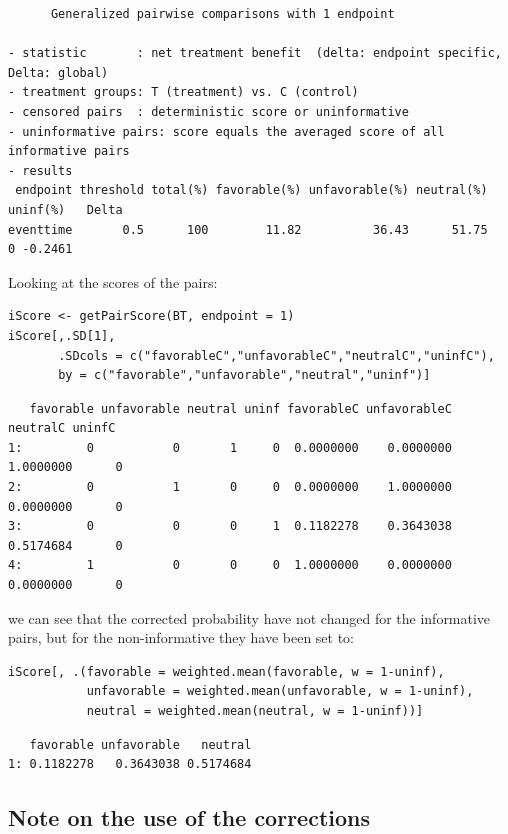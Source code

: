 \documentclass[12pt]{article}
\begin{document}
\begin{verbatim}
      Generalized pairwise comparisons with 1 endpoint

- statistic       : net treatment benefit  (delta: endpoint specific, Delta: global) 
- treatment groups: T (treatment) vs. C (control) 
- censored pairs  : deterministic score or uninformative
- uninformative pairs: score equals the averaged score of all informative pairs
- results
 endpoint threshold total(%) favorable(%) unfavorable(%) neutral(%) uninf(%)   Delta
eventtime       0.5      100        11.82          36.43      51.75        0 -0.2461
\end{verbatim}



Looking at the scores of the pairs:
\lstset{language=r,label= ,caption= ,captionpos=b,numbers=none}
\begin{lstlisting}
iScore <- getPairScore(BT, endpoint = 1)
iScore[,.SD[1], 
       .SDcols = c("favorableC","unfavorableC","neutralC","uninfC"),
       by = c("favorable","unfavorable","neutral","uninf")]
\end{lstlisting}

\begin{verbatim}
   favorable unfavorable neutral uninf favorableC unfavorableC  neutralC uninfC
1:         0           0       1     0  0.0000000    0.0000000 1.0000000      0
2:         0           1       0     0  0.0000000    1.0000000 0.0000000      0
3:         0           0       0     1  0.1182278    0.3643038 0.5174684      0
4:         1           0       0     0  1.0000000    0.0000000 0.0000000      0
\end{verbatim}


we can see that the corrected probability have not changed for the
informative pairs, but for the non-informative they have been set to:
\lstset{language=r,label= ,caption= ,captionpos=b,numbers=none}
\begin{lstlisting}
iScore[, .(favorable = weighted.mean(favorable, w = 1-uninf), 
           unfavorable = weighted.mean(unfavorable, w = 1-uninf), 
           neutral = weighted.mean(neutral, w = 1-uninf))]
\end{lstlisting}

\begin{verbatim}
   favorable unfavorable   neutral
1: 0.1182278   0.3643038 0.5174684
\end{verbatim}

\subsection{Note on the use of the corrections}
\label{sec:org5e20c90}
\end{document}
